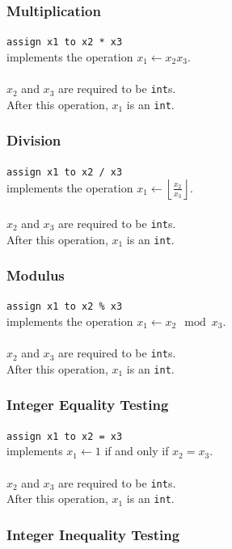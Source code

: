\documentclass[11pt]{report}
\begin{document}
\subsubsection{Multiplication}

\texttt{assign x1 to x2 * x3} \\
implements the operation $x_1 \leftarrow x_2 x_3$. \\ \\
$x_2$ and $x_3$ are required to be \texttt{int}s. \\
After this operation, $x_1$ is an \texttt{int}.

\subsubsection{Division} 

\texttt{assign x1 to x2 / x3} \\
implements the operation $x_1 \leftarrow \left \lfloor{\frac{x_2}{x_3}}\right \rfloor$. \\ \\
$x_2$ and $x_3$ are required to be \texttt{int}s. \\
After this operation, $x_1$ is an \texttt{int}.

\subsubsection{Modulus} 

\texttt{assign x1 to x2 \% x3} \\
implements the operation $x_1 \leftarrow x_2\mod x_3$. \\ \\
$x_2$ and $x_3$ are required to be \texttt{int}s. \\
After this operation, $x_1$ is an \texttt{int}.

\subsubsection{Integer Equality Testing}

\texttt{assign x1 to x2 = x3} \\
implements $x_1 \leftarrow 1$ if and only if $x_2 = x_3$. \\ \\
$x_2$ and $x_3$ are required to be \texttt{int}s. \\
After this operation, $x_1$ is an \texttt{int}.

\subsubsection{Integer Inequality Testing}
\end{document}

